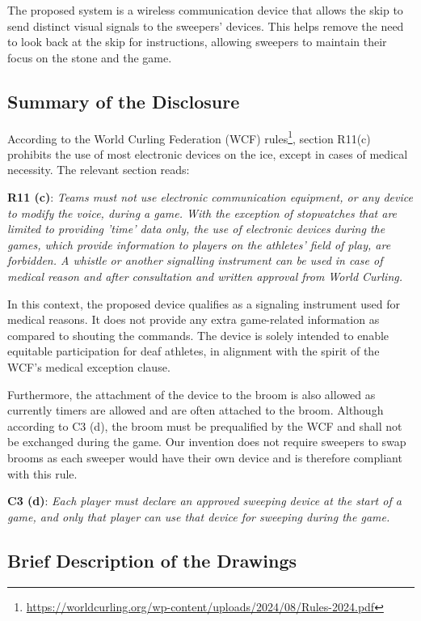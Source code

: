 \documentclass{article}
\begin{document}
The proposed system is a wireless communication device that allows the skip to send distinct visual signals to the sweepers' devices. This helps remove the need to look back at the skip for instructions, allowing sweepers to maintain their focus on the stone and the game.



\subsection{Summary of the Disclosure}
According to the World Curling Federation (WCF) rules\footnote{\url{https://worldcurling.org/wp-content/uploads/2024/08/Rules-2024.pdf}}, section R11(c) prohibits the use of most electronic devices on the ice, except in cases of medical necessity. The relevant section reads:

\textbf{R11 (c)}: \textit{Teams must not use electronic communication equipment, or any device to modify the voice, during a game. With the exception of stopwatches that are limited to providing 'time' data only, the use of electronic devices during the games, which provide information to players on the athletes' field of play, are forbidden. A whistle or another signalling instrument can be used in case of medical reason and after consultation and written approval from World Curling.}

In this context, the proposed device qualifies as a signaling instrument used for medical reasons. It does not provide any extra game-related information as compared to shouting the commands. The device is solely intended to enable equitable participation for deaf athletes, in alignment with the spirit of the WCF's medical exception clause.

Furthermore, the attachment of the device to the broom is also allowed as currently timers are allowed and are often attached to the broom. Although according to C3 (d), the broom must be prequalified by the WCF and shall not be exchanged during the game. Our invention does not require sweepers to swap brooms as each sweeper would have their own device and is therefore compliant with this rule.

\textbf{C3 (d)}: \textit{Each player must declare an approved sweeping device at the start of a game, and only that player can use that device for sweeping during the game.}


\subsection{Brief Description of the Drawings}
\end{document}
